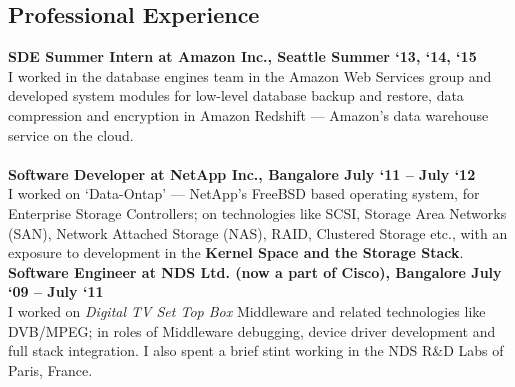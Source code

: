 \documentclass[letterpaper, 11pt]{article}
\begin{document}
	\subsection{Professional Experience}
	
	\textbf{SDE Summer Intern at Amazon Inc., Seattle \hfill Summer `13, `14,
		`15}\\
	I worked in the database engines team in the Amazon Web Services group and
	developed system modules for low-level database backup and restore, data
	compression and encryption in 
	Amazon Redshift --- Amazon's data warehouse service on the cloud.\\
	\\
	\textbf{Software Developer at NetApp Inc., Bangalore \hfill July `11 -- July
		`12}\\
	I worked on `Data-Ontap' --- NetApp's FreeBSD based operating system, for
	Enterprise Storage Controllers; on technologies like SCSI, Storage Area
	Networks
	(SAN), Network Attached Storage (NAS), RAID, Clustered Storage etc., with an
	exposure to development in the \textbf{Kernel Space and the Storage Stack}.\\
	
	\textbf{Software Engineer at NDS Ltd. (now a part of Cisco), Bangalore \hfill
		July `09 -- July `11}\\
	I worked on \emph{Digital TV Set Top Box} Middleware and related technologies
	like DVB/MPEG; in roles of Middleware debugging, device driver development and
	full stack integration. I also spent a brief stint working
	in the NDS R\&D Labs of Paris, France.
	
	
\end{document}
